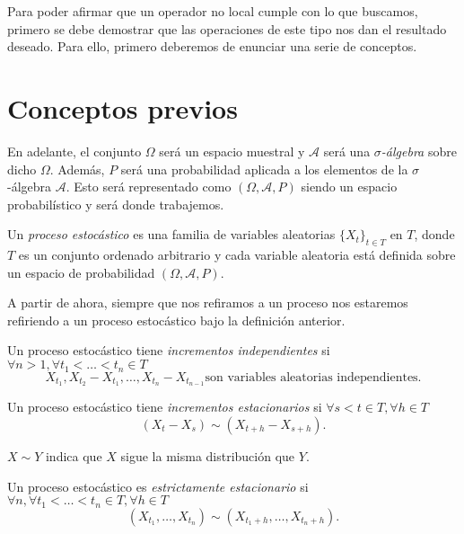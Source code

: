 Para poder afirmar que un operador no local cumple con lo que buscamos, primero se debe demostrar que las operaciones de este tipo nos dan el resultado deseado. Para ello, primero deberemos de enunciar una serie de conceptos.

\section{Conceptos previos}
En adelante, el conjunto $\Omega$ será un espacio muestral y $\mathscr{A}$ será una \emph{$\sigma$-álgebra} sobre dicho $\Omega$. Además, $P$ será una probabilidad aplicada a los elementos de la $\sigma$-álgebra $\mathscr{A}$. Esto será representado como $(\Omega,\mathscr{A},P)$ siendo un espacio probabilístico y será donde trabajemos.

\begin{definicion}\label{def:pe}
  Un \emph{proceso estocástico} es una familia de variables aleatorias ${\{X_t\}}_{t \in T}$ en $T$, donde $T$ es un conjunto ordenado arbitrario y cada variable aleatoria está definida sobre un espacio de probabilidad $(\Omega, \mathscr{A}, P)$.
\end{definicion}

A partir de ahora, siempre que nos refiramos a un proceso nos estaremos refiriendo a un proceso estocástico bajo la definición anterior. \\

\begin{definicion}
  Un proceso estocástico tiene \emph{incrementos independientes} si $\forall n > 1, \forall t_1 < \ldots < t_n \in T$ $$X_{t_1}, X_{t_2} - X_{t_1}, \ldots, X_{t_n} - X_{t_{n-1}} \text{son variables aleatorias independientes.}$$
\end{definicion}

\begin{definicion}
  Un proceso estocástico tiene \emph{incrementos estacionarios} si $\forall s < t \in T, \forall h\in T$  $$(X_t - X_s) \sim (X_{t+h} - X_{s+h}).$$
\end{definicion}

\begin{nota}
  $X \sim Y$ indica que $X$ sigue la misma distribución que $Y$.
\end{nota}

\begin{definicion}
  Un proceso estocástico es \emph{estrictamente estacionario} si $\forall n, \forall t_1 < \ldots < t_n \in T, \forall h \in T$ $$(X_{t_1}, \ldots, X_{t_n}) \sim (X_{t_1 + h}, \ldots, X_{t_n + h}).$$
\end{definicion}

